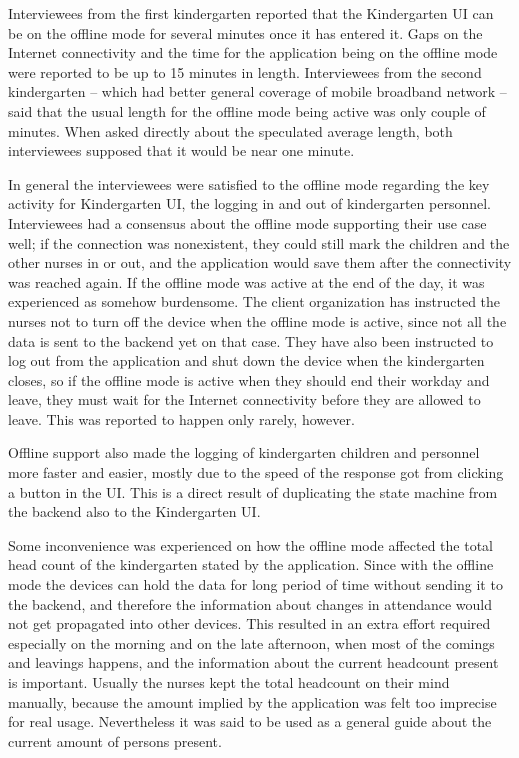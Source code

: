 Interviewees from the first kindergarten reported that the Kindergarten UI can be on the offline mode for several minutes once it has entered it. Gaps on the Internet connectivity and the time for the application being on the offline mode were reported to be up to 15 minutes in length. Interviewees from the second kindergarten -- which had better general coverage of mobile broadband network -- said that the usual length for the offline mode being active was only couple of minutes. When asked directly about the speculated average length, both interviewees supposed that it would be near one minute.

In general the interviewees were satisfied to the offline mode regarding the key activity for Kindergarten UI, the logging in and out of kindergarten personnel. Interviewees had a consensus about the offline mode supporting their use case well; if the connection was nonexistent, they could still mark the children and the other nurses in or out, and the application would save them after the connectivity was reached again. If the offline mode was active at the end of the day, it was experienced as somehow burdensome. The client organization has instructed the nurses not to turn off the device when the offline mode is active, since not all the data is sent to the backend yet on that case. They have also been instructed to log out from the application and shut down the device when the kindergarten closes, so if the offline mode is active when they should end their workday and leave, they must wait for the Internet connectivity before they are allowed to leave. This was reported to happen only rarely, however.

Offline support also made the logging of kindergarten children and personnel more faster and easier, mostly due to the speed of the response got from clicking a button in the UI. This is a direct result of duplicating the state machine from the backend also to the Kindergarten UI. 

Some inconvenience was experienced on how the offline mode affected the total head count of the kindergarten stated by the application. Since with the offline mode the devices can hold the data for long period of time without sending it to the backend, and therefore the information about changes in attendance would not get propagated into other devices. This resulted in an extra effort required especially on the morning and on the late afternoon, when most of the comings and leavings happens, and the information about the current headcount present is important. Usually the nurses kept the total headcount on their mind manually, because the amount implied by the application was felt too imprecise for real usage. Nevertheless it was said to be used as a general guide about the current amount of persons present.

